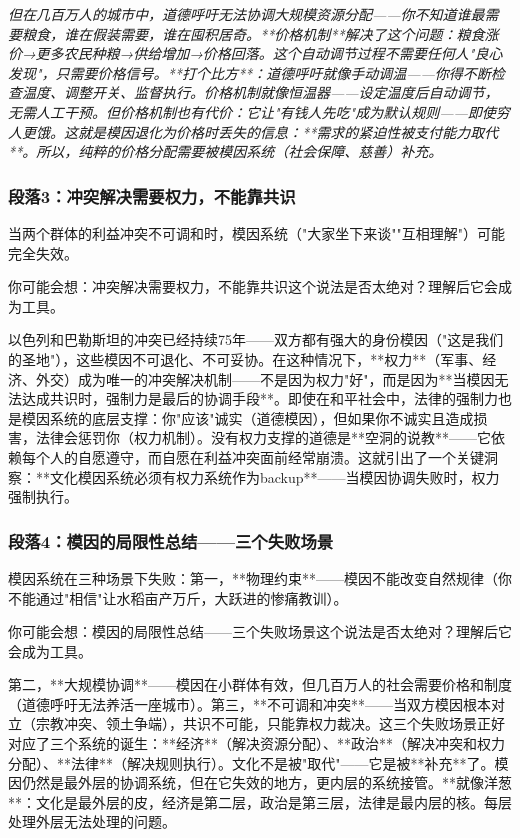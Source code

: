 \documentclass[a4paper,12pt]{book}
\newenvironment{motivation}{\begin{tcolorbox}[colback=gray!10,colframe=gray!60,title=\textit{动机}]\small\itshape}{\end{tcolorbox}}
\begin{document}
\begin{motivation}
\begin{motivation}
\begin{motivation}
但在几百万人的城市中，道德呼吁无法协调大规模资源分配——你不知道谁最需要粮食，谁在假装需要，谁在囤积居奇。**价格机制**解决了这个问题：粮食涨价→更多农民种粮→供给增加→价格回落。这个自动调节过程不需要任何人"良心发现"，只需要价格信号。**打个比方**：道德呼吁就像手动调温——你得不断检查温度、调整开关、监督执行。价格机制就像恒温器——设定温度后自动调节，无需人工干预。但价格机制也有代价：它让"有钱人先吃"成为默认规则——即使穷人更饿。这就是模因退化为价格时丢失的信息：**需求的紧迫性被支付能力取代**。所以，纯粹的价格分配需要被模因系统（社会保障、慈善）补充。

	\subsubsection*{段落3：冲突解决需要权力，不能靠共识}
	当两个群体的利益冲突不可调和时，模因系统（"大家坐下来谈""互相理解"）可能完全失效。
	\begin{tcolorbox}[colback=yellow!5, title=\textit{读者行为预测}]
		你可能会想：冲突解决需要权力，不能靠共识这个说法是否太绝对？理解后它会成为工具。
	\end{tcolorbox}

以色列和巴勒斯坦的冲突已经持续75年——双方都有强大的身份模因（"这是我们的圣地"），这些模因不可退化、不可妥协。在这种情况下，**权力**（军事、经济、外交）成为唯一的冲突解决机制——不是因为权力"好"，而是因为**当模因无法达成共识时，强制力是最后的协调手段**。即使在和平社会中，法律的强制力也是模因系统的底层支撑：你"应该"诚实（道德模因），但如果你不诚实且造成损害，法律会惩罚你（权力机制）。没有权力支撑的道德是**空洞的说教**——它依赖每个人的自愿遵守，而自愿在利益冲突面前经常崩溃。这就引出了一个关键洞察：**文化模因系统必须有权力系统作为backup**——当模因协调失败时，权力强制执行。

	\subsubsection*{段落4：模因的局限性总结——三个失败场景}
	模因系统在三种场景下失败：第一，**物理约束**——模因不能改变自然规律（你不能通过"相信"让水稻亩产万斤，大跃进的惨痛教训）。
	\begin{tcolorbox}[colback=yellow!5, title=\textit{读者行为预测}]
		你可能会想：模因的局限性总结——三个失败场景这个说法是否太绝对？理解后它会成为工具。
	\end{tcolorbox}

第二，**大规模协调**——模因在小群体有效，但几百万人的社会需要价格和制度（道德呼吁无法养活一座城市）。第三，**不可调和冲突**——当双方模因根本对立（宗教冲突、领土争端），共识不可能，只能靠权力裁决。这三个失败场景正好对应了三个系统的诞生：**经济**（解决资源分配）、**政治**（解决冲突和权力分配）、**法律**（解决规则执行）。文化不是被"取代"——它是被**补充**了。模因仍然是最外层的协调系统，但在它失效的地方，更内层的系统接管。**就像洋葱**：文化是最外层的皮，经济是第二层，政治是第三层，法律是最内层的核。每层处理外层无法处理的问题。


\end{motivation}
\end{motivation}
\end{motivation}
\end{document}
